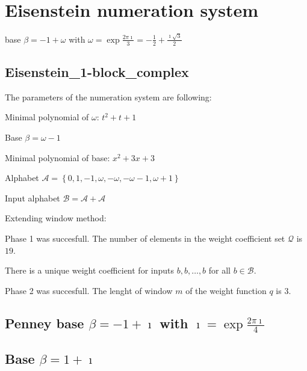




\section{Eisenstein numeration system }
base $\beta = -1 + \omega$ with $\omega = \exp{\frac{2 \pi \imath}{3}} = -\frac{1}{2} + \frac{\imath \sqrt{3}}{2}$


\subsection{ Eisenstein\_1-block\_complex }

\label{subsec: Eisenstein1-blockcomplex }

The parameters of the numeration system are following:

Minimal polynomial of $\omega$: $ t^{2} + t + 1 $

Base $\beta= \omega - 1 $

Minimal polynomial of base: $ x^{2} + 3x + 3 $

Alphabet $\mathcal{A} =\left\{0, 1, -1, \omega, -\omega, -\omega - 1, \omega + 1\right\}$

Input alphabet $\mathcal{B} =\mathcal{A}+ \mathcal{A}$ 

\rule{0mm}{0mm}\newline


Extending window method:

Phase 1 was succesfull.
The number of elements in the weight coefficient set $\mathcal{Q}$ is $ 19 $.

There is a unique weight coefficient for inputs $b,b,\dots,b$ for all $b\in\mathcal{B}$.

Phase 2 was succesfull.
The lenght of window $m$ of the weight function $q$ is 3. \checkmark



\subsection{Penney base $\beta = -1 + \imath$ with $\imath = \exp{\frac{2 \pi \imath}{4}}$}


\subsection{Base $\beta = 1 + \imath$}



